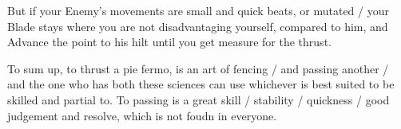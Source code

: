 But if your Enemy's movements are small and quick beats, or mutated /
your Blade stays where you are not disadvantaging yourself, compared
to him, and Advance the point to his hilt until you get measure for
the thrust.


To sum up, to thrust a pie fermo, is an art of fencing / and passing
another / and the one who has both these sciences can use whichever is
best suited to be skilled and partial to. To passing is a great skill
/ stability / quickness / good judgement and resolve, which is not
foudn in everyone.